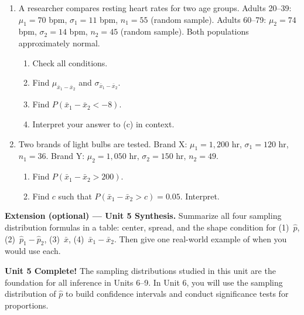 \documentclass[10pt]{article}
\begin{document}
\namedateperiod

\vspace{0.15in}

\begin{enumerate}

  \item A researcher compares resting heart rates for two age groups.
        Adults 20--39: $\mu_1 = 70$ bpm, $\sigma_1 = 11$ bpm, $n_1 = 55$ (random sample).
        Adults 60--79: $\mu_2 = 74$ bpm, $\sigma_2 = 14$ bpm, $n_2 = 45$ (random sample).
        Both populations approximately normal.
        \begin{enumerate}[label=\alph*.]
          \item Check all conditions.
          \item Find $\mu_{\bar{x}_1-\bar{x}_2}$ and $\sigma_{\bar{x}_1-\bar{x}_2}$.
                \vspace{0.5in}
          \item Find $P(\bar{x}_1 - \bar{x}_2 < -8)$.
                \vspace{0.9in}
          \item Interpret your answer to (c) in context.
        \end{enumerate}

  \item Two brands of light bulbs are tested. Brand X: $\mu_1 = 1{,}200$ hr, $\sigma_1 = 120$ hr, $n_1 = 36$.
        Brand Y: $\mu_2 = 1{,}050$ hr, $\sigma_2 = 150$ hr, $n_2 = 49$.
        \begin{enumerate}[label=\alph*.]
          \item Find $P(\bar{x}_1 - \bar{x}_2 > 200)$.
                \vspace{0.9in}
          \item Find $c$ such that $P(\bar{x}_1 - \bar{x}_2 > c) = 0.05$. Interpret.
                \vspace{0.9in}
        \end{enumerate}

\end{enumerate}

\begin{extensionbox}
\textbf{Extension (optional) --- Unit 5 Synthesis.}
Summarize all four sampling distribution formulas in a table:
center, spread, and the shape condition for (1)~$\hat{p}$, (2)~$\hat{p}_1-\hat{p}_2$,
(3)~$\bar{x}$, (4)~$\bar{x}_1-\bar{x}_2$. Then give one real-world example of when you
would use each.
\end{extensionbox}

\begin{reflectionbox}
\textbf{Unit 5 Complete!} The sampling distributions studied in this unit are the foundation
for all inference in Units 6--9. In Unit 6, you will use the sampling distribution of $\hat{p}$
to build confidence intervals and conduct significance tests for proportions.
\end{reflectionbox}
\end{document}
